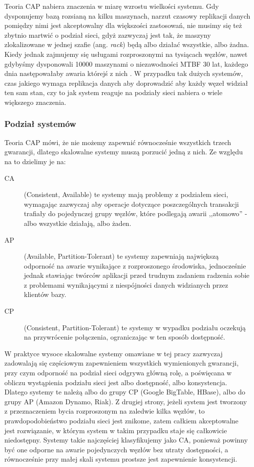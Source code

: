 Teoria CAP nabiera znaczenia w miarę wzrostu wielkości systemu. 
Gdy dysponujemy bazą rozsianą na kilku maszynach, narzut czasowy replikacji danych pomiędzy nimi jest akceptowalny dla większości zastosowań, nie musimy się też zbytnio martwić o podział sieci, gdyż zazwyczaj jest tak, że maszyny zlokalizowane w jednej szafie (ang. \emph{rack}) będą albo działać wszystkie, albo żadna. 
Kiedy jednak zajmujemy się usługami rozproszonymi na tysiącach węzłów, nawet gdybyśmy dysponowali 10000 maszynami o niezawodności MTBF 30 lat, każdego dnia następowałaby awaria którejś z nich \cite{google-lessons}. 
W przypadku tak dużych systemów, czas jakiego wymaga replikacja danych aby doprowadzić aby każdy węzeł widział ten sam stan, czy to jak system reaguje na podziały sieci nabiera o wiele większego znaczenia.

\subsubsection*{Podział systemów}

Teoria CAP mówi, że nie możemy zapewnić równocześnie wszystkich trzech gwarancji, dlatego skalowalne systemy muszą porzucić jedną z nich. 
Ze względu na to dzielimy je na:

\begin{description}
 \item[CA] (Consistent, Available) te systemy mają problemy z podziałem sieci, wymagając zazwyczaj aby operacje dotyczące poszczególnych transakcji trafiały do pojedynczej grupy węzłów, które podlegają awarii ,,atomowo'' - albo wszystkie działają, albo żaden. 
 \item[AP] (Available, Partition-Tolerant) te systemy zapewniają największą odporność na awarie wynikające z rozproszonego środowiska, jednocześnie jednak stawiając twórców aplikacji przed trudnym zadaniem radzenia sobie z problemami wynikającymi z niespójności danych widzianych przez klientów bazy.
 \item[CP] (Consistent, Partition-Tolerant) te systemy w wypadku podziału oczekują na przywrócenie połączenia, ograniczając w ten sposób dostępność.
\end{description}

W praktyce wysoce skalowalne systemy omawiane w tej pracy zazwyczaj zadowalają się częściowym zapewnieniem wszystkich wymienionych gwarancji, przy czym odporność na podział sieci odgrywa główną rolę, a poświęcana w obliczu wystąpienia podziału sieci jest albo dostępność, albo konsystencja. 
Dlatego systemy te należą albo do grupy CP (Google BigTable, HBase), albo do grupy AP (Amazon Dynamo, Riak).
Z drugiej strony, jeżeli system jest tworzony z przeznaczeniem bycia rozproszonym na zaledwie kilka węzłów, to prawdopodobieństwo podziału sieci jest znikome, zatem całkiem akceptowalne jest rozwiązanie, w którym system w takim przypadku staje się całkowicie niedostępny.
Systemy takie najczęściej klasyfikujemy jako CA, ponieważ powinny być one odporne na awarie pojedynczych węzłów bez utraty dostępności, a równocześnie przy małej skali systemu prostsze jest zapewnienie konsystencji.

